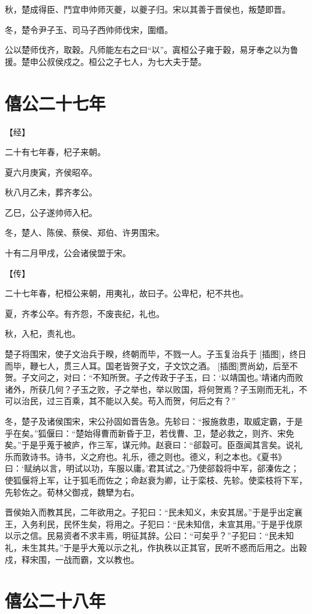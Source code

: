 \documentclass[a4paper,12pt,UTF8,twoside]{ctexbook}
\begin{document}
秋，楚成得臣、鬥宜申帅师灭夔，以夔子归。宋以其善于晋侯也，叛楚即晋。

冬，楚令尹子玉、司马子西帅师伐宋，圍缗。

公以楚师伐齐，取穀。凡师能左右之曰“以”。寘桓公子雍于穀，易牙奉之以为鲁援。楚申公叔侯戍之。桓公之子七人，为七大夫于楚。


\chapter{僖公二十七年}


【经】

二十有七年春，杞子来朝。

夏六月庚寅，齐侯昭卒。

秋八月乙未，葬齐孝公。

乙巳，公子遂帅师入杞。

冬，楚人、陈侯、蔡侯、郑伯、许男围宋。

十有二月甲戌，公会诸侯盟于宋。

【传】

二十七年春，杞桓公来朝，用夷礼，故曰子。公卑杞，杞不共也。

夏，齐孝公卒。有齐怨，不废丧纪，礼也。

秋，入杞，责礼也。

楚子将围宋，使子文治兵于睽，终朝而毕，不戮一人。子玉复治兵于 [插图]，终日而毕，鞭七人，贯三人耳。国老皆贺子文，子文饮之酒。 [插图]贾尚幼，后至不贺。子文问之，对曰：“不知所贺。子之传政于子玉，曰：‘以靖国也。’靖诸内而败诸外，所获几何？子玉之败，子之举也，举以败国，将何贺焉？子玉刚而无礼，不可以治民，过三百乘，其不能以入矣。苟入而贺，何后之有？”

冬，楚子及诸侯围宋，宋公孙固如晋告急。先轸曰：“报施救患，取威定霸，于是乎在矣。”狐偃曰：“楚始得曹而新昏于卫，若伐曹、卫，楚必救之，则齐、宋免矣。”于是乎蒐于被庐，作三军，谋元帅。赵衰曰：“郤縠可。臣亟闻其言矣。说礼乐而敦诗书。诗书，义之府也。礼乐，德之则也。德义，利之本也。《夏书》曰：‘赋纳以言，明试以功，车服以庸。’君其试之。”乃使郤縠将中军，郤溱佐之；使狐偃将上军，让于狐毛而佐之；命赵衰为卿，让于栾枝、先轸。使栾枝将下军，先轸佐之。荀林父御戎，魏犫为右。

晋侯始入而教其民，二年欲用之。子犯曰：“民未知义，未安其居。”于是乎出定襄王，入务利民，民怀生矣，将用之。子犯曰：“民未知信，未宣其用。”于是乎伐原以示之信。民易资者不求丰焉，明征其辞。公曰：“可矣乎？”子犯曰：“民未知礼，未生其共。”于是乎大蒐以示之礼，作执秩以正其官，民听不惑而后用之。出穀戍，释宋围，一战而霸，文以教也。

\chapter{僖公二十八年}
\end{document}
